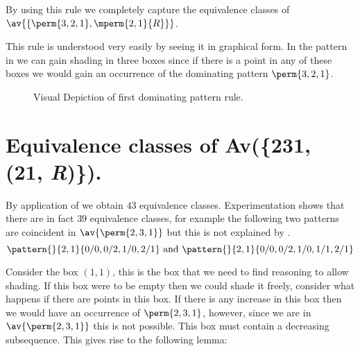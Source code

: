 By using this rule we completely capture the equivalence classes of
\(\av{\{\perm{3,2,1}, \mperm{2,1}{R}\}}\).

This rule is understood very easily by seeing it in graphical form. In the
pattern in  we can gain shading in three boxes since if
there is a point in any of these boxes we would gain an occurrence of the
dominating pattern \(\perm{3,2,1}\).

\begin{figure}[htb]
    \begin{center}
        \raisebox{2ex}{\(\mapsto\)}

        \caption{Visual Depiction of first dominating pattern rule.}
        \label{fig:rule1}
    \end{center}
\end{figure}

\section{Equivalence classes of Av(\{231, (21, \textit{R})\}).}
By application of  we obtain \(43\) equivalence
classes. Experimentation shows that there are in fact \(39\) equivalence
classes, for example the following two patterns are coincident in
\(\av{\perm{2,3,1}}\) but this is not explained by .
\begin{equation*}
    \pattern{}{2,1}{0/0,0/2,1/0,2/1} \text{ and } \pattern{}{2,1}{0/0,0/2,1/0,1/1,2/1}
\end{equation*}

Consider the box \((1,1)\), this is the box that we need to find reasoning
to allow shading. If this box were to be empty then we could shade it freely,
consider what happens if there are points in this box.  If there is any
increase in this box then we would have an occurrence of \(\perm{2,3,1}\),
however, since we are in \(\av{\perm{2,3,1}}\) this is not possible. This box
must contain a decreasing subsequence. This gives rise to the following lemma:

